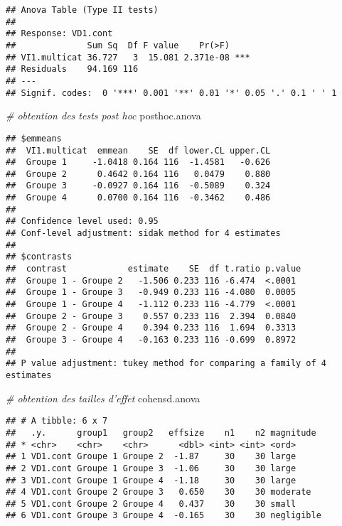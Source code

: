 \documentclass[
]{book}
\newenvironment{Shaded}{\begin{snugshade}}{\end{snugshade}}
\newcommand{\CommentTok}[1]{\textcolor[rgb]{0.56,0.35,0.01}{\textit{#1}}}
\newcommand{\NormalTok}[1]{#1}
\begin{document}
\begin{verbatim}
## Anova Table (Type II tests)
## 
## Response: VD1.cont
##              Sum Sq  Df F value    Pr(>F)    
## VI1.multicat 36.727   3  15.081 2.371e-08 ***
## Residuals    94.169 116                      
## ---
## Signif. codes:  0 '***' 0.001 '**' 0.01 '*' 0.05 '.' 0.1 ' ' 1
\end{verbatim}

\begin{Shaded}
\begin{Highlighting}[]
\CommentTok{# obtention des tests post hoc }
\NormalTok{posthoc.anova}
\end{Highlighting}
\end{Shaded}

\begin{verbatim}
## $emmeans
##  VI1.multicat  emmean    SE  df lower.CL upper.CL
##  Groupe 1     -1.0418 0.164 116  -1.4581   -0.626
##  Groupe 2      0.4642 0.164 116   0.0479    0.880
##  Groupe 3     -0.0927 0.164 116  -0.5089    0.324
##  Groupe 4      0.0700 0.164 116  -0.3462    0.486
## 
## Confidence level used: 0.95 
## Conf-level adjustment: sidak method for 4 estimates 
## 
## $contrasts
##  contrast            estimate    SE  df t.ratio p.value
##  Groupe 1 - Groupe 2   -1.506 0.233 116 -6.474  <.0001 
##  Groupe 1 - Groupe 3   -0.949 0.233 116 -4.080  0.0005 
##  Groupe 1 - Groupe 4   -1.112 0.233 116 -4.779  <.0001 
##  Groupe 2 - Groupe 3    0.557 0.233 116  2.394  0.0840 
##  Groupe 2 - Groupe 4    0.394 0.233 116  1.694  0.3313 
##  Groupe 3 - Groupe 4   -0.163 0.233 116 -0.699  0.8972 
## 
## P value adjustment: tukey method for comparing a family of 4 estimates
\end{verbatim}

\begin{Shaded}
\begin{Highlighting}[]
\CommentTok{# obtention des tailles d'effet }
\NormalTok{cohensd.anova}
\end{Highlighting}
\end{Shaded}

\begin{verbatim}
## # A tibble: 6 x 7
##   .y.      group1   group2   effsize    n1    n2 magnitude 
## * <chr>    <chr>    <chr>      <dbl> <int> <int> <ord>     
## 1 VD1.cont Groupe 1 Groupe 2  -1.87     30    30 large     
## 2 VD1.cont Groupe 1 Groupe 3  -1.06     30    30 large     
## 3 VD1.cont Groupe 1 Groupe 4  -1.18     30    30 large     
## 4 VD1.cont Groupe 2 Groupe 3   0.650    30    30 moderate  
## 5 VD1.cont Groupe 2 Groupe 4   0.437    30    30 small     
## 6 VD1.cont Groupe 3 Groupe 4  -0.165    30    30 negligible
\end{verbatim}
\end{document}
